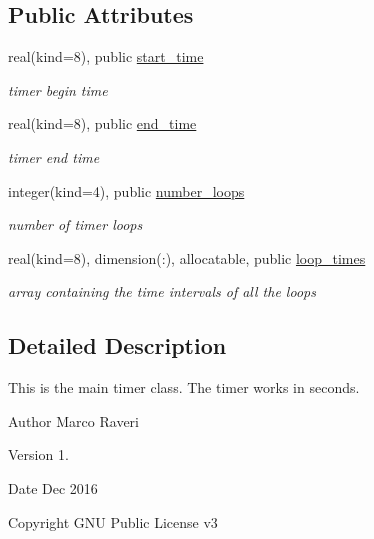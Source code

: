 \subsection*{Public Attributes}
\begin{DoxyCompactItemize}
\item 
real(kind=8), public \hyperlink{structf2k__timer_1_1timer_ab0fc31e03517687fcb0bfdd357f332ab}{start\+\_\+time}
\begin{DoxyCompactList}\small\item\em timer begin time \end{DoxyCompactList}\item 
real(kind=8), public \hyperlink{structf2k__timer_1_1timer_af5fd0bdd12fb2d3a6ceb05bc360382de}{end\+\_\+time}
\begin{DoxyCompactList}\small\item\em timer end time \end{DoxyCompactList}\item 
integer(kind=4), public \hyperlink{structf2k__timer_1_1timer_af06ab0260ee7e89251d9746c11bcec3e}{number\+\_\+loops}
\begin{DoxyCompactList}\small\item\em number of timer loops \end{DoxyCompactList}\item 
real(kind=8), dimension(\+:), allocatable, public \hyperlink{structf2k__timer_1_1timer_aa1d7d7a95322ad486358962f98311777}{loop\+\_\+times}
\begin{DoxyCompactList}\small\item\em array containing the time intervals of all the loops \end{DoxyCompactList}\end{DoxyCompactItemize}


\subsection{Detailed Description}
This is the main timer class. The timer works in seconds. 

\begin{DoxyAuthor}{Author}
Marco Raveri 
\end{DoxyAuthor}
\begin{DoxyVersion}{Version}
1. 
\end{DoxyVersion}
\begin{DoxyDate}{Date}
Dec 2016 
\end{DoxyDate}
\begin{DoxyCopyright}{Copyright}
G\+NU Public License v3 
\end{DoxyCopyright}


